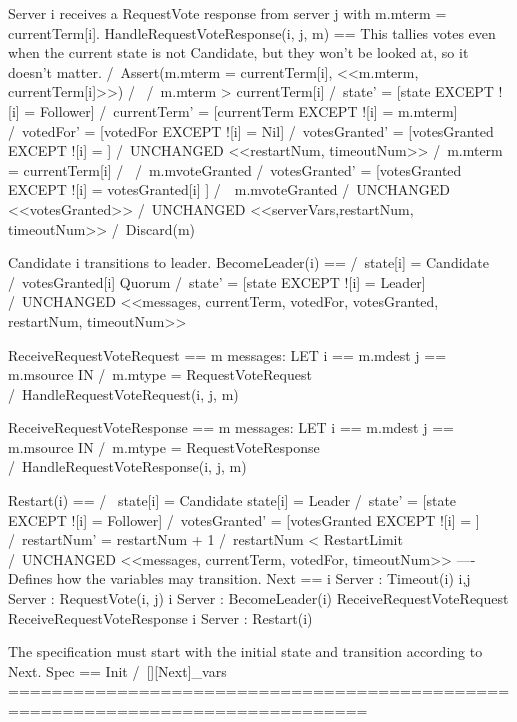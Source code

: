 \* Server i receives a RequestVote response from server j with
\* m.mterm = currentTerm[i].
HandleRequestVoteResponse(i, j, m) ==
    \* This tallies votes even when the current state is not Candidate, but
    \* they won't be looked at, so it doesn't matter. 
    \* /\ Assert(m.mterm = currentTerm[i], <<m.mterm, currentTerm[i]>>)
    /\ \/ /\ m.mterm > currentTerm[i]
          /\ state'        = [state EXCEPT ![i] = Follower]
          /\ currentTerm'  = [currentTerm EXCEPT ![i] = m.mterm]
          /\ votedFor'     = [votedFor EXCEPT ![i] = Nil]
          /\ votesGranted' = [votesGranted EXCEPT ![i] = {}]
          /\ UNCHANGED <<restartNum, timeoutNum>>
       \/ /\ m.mterm = currentTerm[i]
          /\ \/ /\ m.mvoteGranted
                /\ votesGranted' = [votesGranted EXCEPT ![i] =
                                    votesGranted[i] ]
             \/ /\ ~m.mvoteGranted
                /\ UNCHANGED <<votesGranted>>
          /\ UNCHANGED <<serverVars,restartNum, timeoutNum>>
    /\ Discard(m)

\* Candidate i transitions to leader.
BecomeLeader(i) ==
    /\ state[i] = Candidate
    /\ votesGranted[i] \in Quorum
    /\ state'      = [state EXCEPT ![i] = Leader]
    /\ UNCHANGED <<messages, currentTerm, votedFor, votesGranted, restartNum, timeoutNum>>

ReceiveRequestVoteRequest ==
    \E m \in messages:
    LET i == m.mdest
        j == m.msource
    IN /\ m.mtype = RequestVoteRequest
       /\ HandleRequestVoteRequest(i, j, m)

          
ReceiveRequestVoteResponse ==
    \E m \in messages:
    LET i == m.mdest
        j == m.msource
    IN /\ m.mtype = RequestVoteResponse
       /\ HandleRequestVoteResponse(i, j, m)

Restart(i) == 
    /\ \/ state[i] = Candidate
       \/ state[i] = Leader 
    /\ state'        = [state EXCEPT ![i] = Follower]
    /\ votesGranted' = [votesGranted EXCEPT ![i] = {}]
    /\ restartNum'   = restartNum + 1
    /\ restartNum    < RestartLimit
    /\ UNCHANGED <<messages, currentTerm, votedFor, timeoutNum>>
----
\* Defines how the variables may transition.
Next ==\/ \E i \in Server : Timeout(i)
       \/ \E i,j \in Server : RequestVote(i, j)  
       \/ \E i \in Server : BecomeLeader(i)
       \/ ReceiveRequestVoteRequest
       \/ ReceiveRequestVoteResponse
       \/ \E i \in Server : Restart(i)

\* The specification must start with the initial state and transition according
\* to Next.
Spec == Init /\ [][Next]_vars
===============================================================================